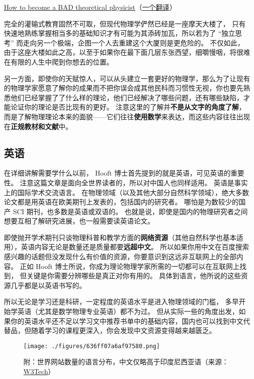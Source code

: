 \href{https://webspace.science.uu.nl/~hooft101/theoristbad.html#:~:text=On\%20your\%20way\%20towards\%20becoming,have\%20your\%20work\%20published\%20anyway.}{How to become a BAD theoretical physicist}（\href{https://zhuanlan.zhihu.com/p/38680467}{一个翻译}）

完全的灌输式教育固然不可取，但现代物理学俨然已经是一座摩天大楼了， 只有快速地熟练掌握相当多的基础知识才有可能为其添砖加瓦，所以若为了 “独立思考” 而走向另一个极端，企图一个人去重建这个大厦则是更危险的。 不仅如此，由于这座大楼如此之高，以至于如果你在最下面几层东张西望，细嚼慢咽，将很难在有限的人生中爬到你想去的位置。

另一方面，即使你的天赋惊人，可以从头建立一套更好的物理学，那么为了让现有的物理学家愿意了解你的成果而不把你误会成其他民科而习惯性无视，你也要先熟悉他们已经掌握了了什么样的理论，他们已经解决了哪些问题，还有哪些缺陷，才能论证你的理论是否比现有的更好。 注意这里的了解并\textbf{不是从文字的角度了解}，而是了解物理理论本来的面貌——它们往往\textbf{使用数学}来表达，而这些内容往往出现在\textbf{正规教材和文献}中。

\subsection{英语}
在详细讲解需要学什么以前， Hooft 博士首先提到的就是英语，可见英语的重要性。 注意这篇文章是面向全世界读者的，所以对中国人也同样适用。 英语是事实上的国际学术交流语言。 在物理领域（以及其他大部分自然科学领域），绝大多数论文都是用英语在欧美期刊上发表的，包括国内的研究者。 哪怕是为数较少的国产 SCI 期刊，也多数是英语或双语的。 也就是说，即使是国内的物理研究者之间想要互相了解研究进展，也一般需要读英语论文。

即使抛开学术期刊只谈物理科普和教学方面的\textbf{网络资源}（其他自然科学也基本适用），英语内容无论是数量还是质量都要\textbf{远超中文}。 所以如果你用中文在百度搜索感兴趣的话题但没发现什么有价值的资源，你要意识到这远非互联网上的全部内容。 正如 Hooft 博士所说，你成为理论物理学家所需的一切都可以在互联网上找到， 但关键是你需要分辨哪些是真正对你有用的。 具体到语言，他所说的这些资源几乎都是以英语书写的。

所以无论是学习还是科研，一定程度的英语水平是进入物理领域的门槛， 多早开始学英语（尤其是数学物理专业英语）都不为过。 但从实际一些的角度出发，如果你的英语水平还不足以学习文中推荐书单中的基础内容，国内也可以找到中文代替品，但随着学习的课程更深入，你会发现中文资源变得越来越匮乏。

\begin{figure}[ht]
\centering
\texttt{[image: ./figures/636ff07a6af97580.png]}
\caption{附：世界网站数量的语言分布，中文仅略高于印度尼西亚语（来源：\href{https://w3techs.com/technologies/overview/content_language}{W3Tech}）} \label{fig_SdyPhy_2}
\end{figure}


